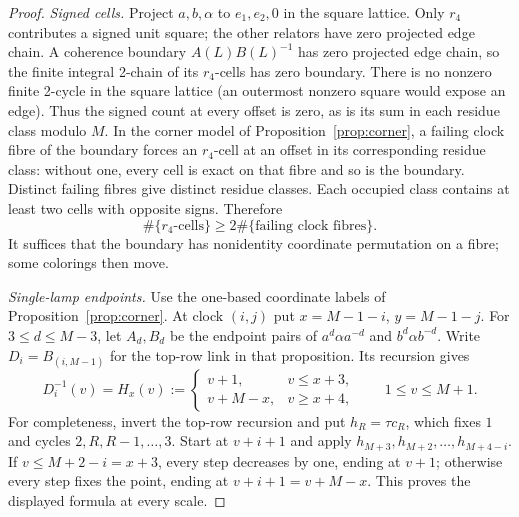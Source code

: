 \documentclass[11pt,a4paper]{article}
\theoremstyle{plain}
\theoremstyle{definition}
\theoremstyle{remark}
\begin{document}
\begin{proof}
\emph{Signed cells.} Project $a,b,\alpha$ to $e_1,e_2,0$ in the square lattice.
Only $r_4$ contributes a signed unit square; the other relators have zero projected edge chain.
A coherence boundary $A(L)B(L)^{-1}$ has zero projected edge chain, so the finite integral 2-chain of its $r_4$-cells has zero boundary.
There is no nonzero finite 2-cycle in the square lattice (an outermost nonzero square would expose an edge).
Thus the signed count at every offset is zero, as is its sum in each residue class modulo $M$.
In the corner model of Proposition~\ref{prop:corner}, a failing clock fibre of the boundary forces an $r_4$-cell at an offset in its
corresponding residue class: without one, every cell is exact on that fibre and so is the boundary.
Distinct failing fibres give distinct residue classes. Each occupied class contains at least two cells with opposite signs. Therefore
\begin{equation}\label{eq:bc-sign-double}
 \#\{r_4\text{-cells}\}\ge2\#\{\text{failing clock fibres}\}.
\end{equation}
It suffices that the boundary has nonidentity coordinate permutation on a fibre; some colorings then move.

\emph{Single-lamp endpoints.} Use the one-based coordinate labels of Proposition~\ref{prop:corner}.
At clock $(i,j)$ put $x=M-1-i$, $y=M-1-j$. For $3\le d\le M-3$, let $A_d,B_d$ be the endpoint pairs of
$a^d\alpha a^{-d}$ and $b^d\alpha b^{-d}$.
Write $D_i=B_{(i,M-1)}$ for the top-row link in that proposition. Its recursion gives
\[
 D_i^{-1}(v)=H_x(v):=
 \begin{cases}v+1,&v\le x+3,\\v+M-x,&v\ge x+4,\end{cases}
 \qquad 1\le v\le M+1.
\]
For completeness, invert the top-row recursion and put $h_R=\tau c_R$, which fixes $1$ and cycles $2,R,R-1,\ldots,3$.
Start at $v+i+1$ and apply $h_{M+3},h_{M+2},\ldots,h_{M+4-i}$.
If $v\le M+2-i=x+3$, every step decreases by one, ending at $v+1$; otherwise every step fixes the point,
ending at $v+i+1=v+M-x$. This proves the displayed formula at every scale.


\end{proof}
\end{document}
